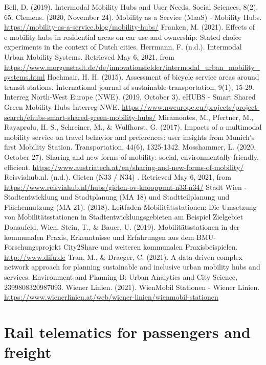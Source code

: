 \documentclass[
]{book}
\begin{document}
Bell, D. (2019). Intermodal Mobility Hubs and User Needs. Social Sciences, 8(2), 65.
Clemens. (2020, November 24). Mobility as a Service (MaaS) - Mobility Hubs. \url{https://mobility-as-a-service.blog/mobility-hubs/}
Franken, M. (2021). Effects of e-mobility hubs in residential areas on car use and ownership: Stated choice experiments in the context of Dutch cities.
Herrmann, F. (n.d.). Intermodal Urban Mobility Systems. Retrieved May 6, 2021, from \url{https://www.morgenstadt.de/de/innovationsfelder/intermodal_urban_mobility_systems.html}
Hochmair, H. H. (2015). Assessment of bicycle service areas around transit stations. International journal of sustainable transportation, 9(1), 15-29.
Interreg North-West Europe (NWE). (2019, October 3). eHUBS - Smart Shared Green Mobility Hubs \textbar{} Interreg NWE. \url{https://www.nweurope.eu/projects/project-search/ehubs-smart-shared-green-mobility-hubs/}
Miramontes, M., Pfertner, M., Rayaprolu, H. S., Schreiner, M., \& Wulfhorst, G. (2017). Impacts of a multimodal mobility service on travel behavior and preferences: user insights from Munich's first Mobility Station. Transportation, 44(6), 1325-1342.
Mosshammer, L. (2020, October 27). Sharing and new forms of mobility: social, environmentally friendly, efficient. \url{https://www.austriatech.at/en/sharing-and-new-forms-of-mobility/}
Reisviahub.nl. (n.d.). Gieten (N33 / N34) . Retrieved May 6, 2021, from \url{https://www.reisviahub.nl/hubs/gieten-ov-knooppunt-n33-n34/}
Stadt Wien - Stadtentwicklung und Stadtplanung (MA 18) und Stadtteilplanung und Flächennutzung (MA 21). (2018). Leitfaden Mobilitätsstationen: Die Umsetzung von Mobilitätsstationen in Stadtentwicklungsgebieten am Beispiel Zielgebiet Donaufeld, Wien.
Stein, T., \& Bauer, U. (2019). Mobilitätsstationen in der kommunalen Praxis, Erkenntnisse und Erfahrungen aus dem BMU-Forschungsprojekt City2Share und weiteren kommunalen Praxisbeispielen. \url{http://www.difu.de}
Tran, M., \& Draeger, C. (2021). A data-driven complex network approach for planning sustainable and inclusive urban mobility hubs and services. Environment and Planning B: Urban Analytics and City Science, 2399808320987093.
Wiener Linien. (2021). WienMobil Stationen - Wiener Linien. \url{https://www.wienerlinien.at/web/wiener-linien/wienmobil-stationen}

\hypertarget{rail_telematics}{%
\section{Rail telematics for passengers and freight}\label{rail_telematics}}
\end{document}
